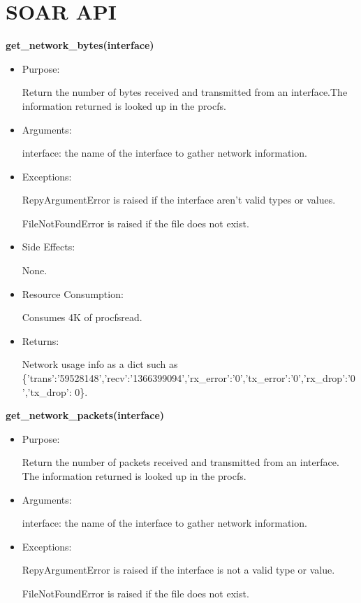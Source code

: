 \chapter{SOAR API}
\label{AppendixA}
{\raggedright
\textbf{get\_network\_bytes(interface)}
\begin{itemize}
\item Purpose:

Return the number of bytes received and transmitted from an interface.The
information returned is looked up in the procfs.

\item Arguments:

interface: the name of the interface to gather network information.

\item Exceptions:

RepyArgumentError is raised if the interface aren't valid types or values.

FileNotFoundError is raised if the file does not exist.

\item Side Effects:

None.

\item Resource Consumption:

Consumes 4K of procfsread.

\item Returns:

Network usage info as a dict such as \{'trans':'59528148','recv':'1366399094','rx\_error':'0','tx\_error':'0','rx\_drop':'0','tx\_drop': 0\}.
\end{itemize}

\textbf{get\_network\_packets(interface)}
\begin{itemize}
\item Purpose:

Return the number of packets received and transmitted from an interface.
The information returned is looked up in the procfs.

\item Arguments:

interface: the name of the interface to gather network information.

\item Exceptions:

RepyArgumentError is raised if the interface is not a valid type or value.

FileNotFoundError is raised if the file does not exist.


\end{itemize}}
